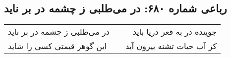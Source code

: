 \begin{center}
\section*{رباعی شماره ۶۸۰: در می‌طلبی ز چشمه در بر ناید}
\label{sec:0680}
\begin{longtable}{l p{0.5cm} r}
در می‌طلبی ز چشمه در بر ناید
&&
جوینده در به قعر دریا باید
\\
این گوهر قیمتی کسی را شاید
&&
کز آب حیات تشنه بیرون آید
\\
\end{longtable}
\end{center}
